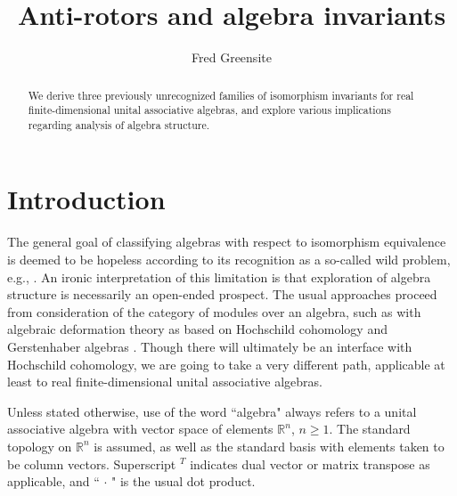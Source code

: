 \documentclass{amsart}
\numberwithin{equation}{section}
\theoremstyle{definition}
\numberwithin{theorem}{section}
\begin{document}
    
    
    
    \title{Anti-rotors and algebra invariants}
    
       \author{Fred Greensite}
 
       \begin{abstract} We derive three previously unrecognized families of isomorphism invariants for real finite-dimensional unital associative algebras, and explore various implications regarding analysis of algebra structure. 
   \end{abstract}
   
    \maketitle
    

\section{Introduction}
The general goal of classifying algebras with respect to isomorphism equivalence is deemed to be hopeless according to its recognition as a so-called wild problem, e.g., \cite{eom:2024,drozd:1972,belitskii:2005}.  An ironic interpretation of this limitation is that exploration of algebra structure is necessarily an open-ended prospect.  
The usual approaches proceed from consideration of the category of modules over an algebra, such as with algebraic deformation theory as based on Hochschild \mbox{cohomology} and Gerstenhaber algebras \cite{hochschild:1945,gerstenhaber:1964}.  Though there will ultimately be an interface with Hochschild cohomology, we are going to take a very different path, applicable at least to real finite-dimensional unital associative algebras.  



Unless stated otherwise, use of the word ``algebra" always refers to a unital associative algebra with vector space of elements $\mathbb{R}^n$, $n\ge 1$.  The standard topology on $\mathbb{R}^n$ is assumed, as well as the standard basis with elements taken to be column vectors.  Superscript $^T$ indicates dual vector or matrix transpose as applicable, and ``$\,\cdot\,$" is the usual dot product.
\end{document}
